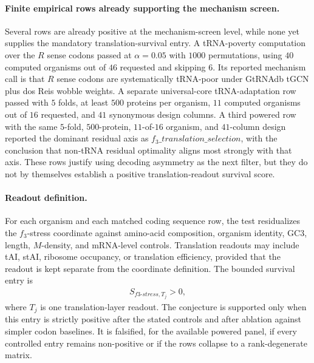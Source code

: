 \paragraph{Finite empirical rows already supporting the mechanism screen.}
Several rows are already positive at the mechanism-screen level, while none yet supplies the mandatory translation-survival entry.  A tRNA-poverty computation over the $R$ sense codons passed at $\alpha=0.05$ with $1000$ permutations, using $40$ computed organisms out of $46$ requested and skipping $6$.  Its reported mechanism call is that $R$ sense codons are systematically tRNA-poor under GtRNAdb tGCN plus dos Reis wobble weights.  A separate universal-core tRNA-adaptation row passed with $5$ folds, at least $500$ proteins per organism, $11$ computed organisms out of $16$ requested, and $41$ synonymous design columns.  A third powered row with the same $5$-fold, $500$-protein, $11$-of-$16$ organism, and $41$-column design reported the dominant residual axis as $f_3\_translation\_selection$, with the conclusion that non-tRNA residual optimality aligns most strongly with that axis.  These rows justify using decoding asymmetry as the next filter, but they do not by themselves establish a positive translation-readout survival score.

\paragraph{Readout definition.}
For each organism and each matched coding sequence row, the test residualizes the $f_3$-stress coordinate against amino-acid composition, organism identity, GC3, length, $M$-density, and mRNA-level controls.  Translation readouts may include tAI, stAI, ribosome occupancy, or translation efficiency, provided that the readout is kept separate from the coordinate definition.  The bounded survival entry is
$$
\begin{aligned}
S_{f3\text{-}stress,T_j} > 0,
\end{aligned}
$$
where $T_j$ is one translation-layer readout.  The conjecture is supported only when this entry is strictly positive after the stated controls and after ablation against simpler codon baselines.  It is falsified, for the available powered panel, if every controlled entry remains non-positive or if the rows collapse to a rank-degenerate matrix.

